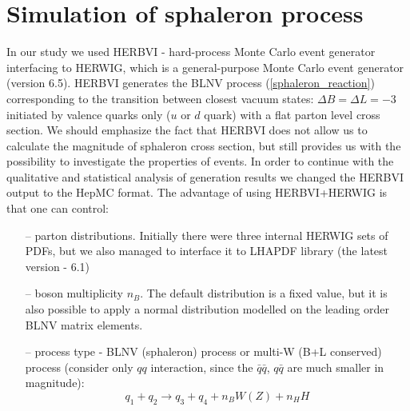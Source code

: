 \documentclass[a4paper,12pt]{article}         %
\begin{document}
\section{Simulation of sphaleron process}

In our study we used HERBVI \cite{herbvi}  - hard-process Monte Carlo event generator interfacing to HERWIG, which is a general-purpose Monte Carlo event generator (version 6.5). HERBVI generates the BLNV process (\ref{sphaleron_reaction}) corresponding to the transition between closest vacuum states: $\Delta B = \Delta L = -3$ initiated by valence quarks only ($u$ or $d$ quark) with a flat parton level cross section. We should emphasize the fact that HERBVI does not allow us to calculate the magnitude of sphaleron cross section, but still provides us with the possibility to investigate the properties of events. In order to continue with the qualitative and statistical analysis of generation results we changed the HERBVI output to the HepMC format. The advantage of using HERBVI+HERWIG is that one can control:
\begin{itemize}
\item[--] parton distributions. Initially there were three internal HERWIG sets \cite{herwig} of PDFs, but we also managed to interface it to LHAPDF library (the latest version - 6.1)
\item[--] boson multiplicity $n_B$. The default distribution is a fixed value, but it is also possible to apply a normal distribution modelled on the leading order BLNV matrix elements.
\item[--] process type - BLNV (sphaleron) process or multi-W (B+L conserved) process (consider only $qq$ interaction, since the $\bar{q}\bar{q}$, $q\bar{q}$ are much smaller in magnitude):
\begin{equation}\label{multi-w_reaction}
q_1 + q_2 \rightarrow q_3 + q_4 + n_B W(Z) + n_H H
\end{equation}
\end{itemize}
\end{document}
